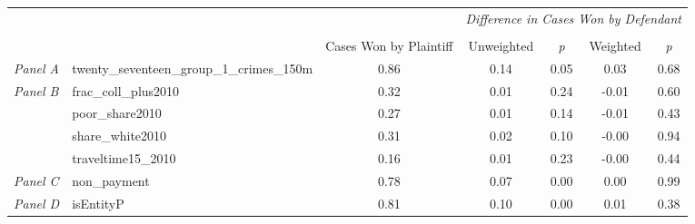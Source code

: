 \begin{tabular}{llccccc}
\toprule
 &  & \textit{} & \multicolumn{4}{c}{\textit{Difference in Cases Won by Defendant}} \\
\cline{4-7}
\\
 &  & Cases Won by Plaintiff & Unweighted & \emph{p} & Weighted & \emph{p} \\
\midrule
\textit{Panel A} & twenty_seventeen_group_1_crimes_150m & 0.86 & 0.14 & 0.05 & 0.03 & 0.68 \\
\cline{1-7}
\multirow[c]{4}{3cm}{\textit{Panel B}} & frac_coll_plus2010 & 0.32 & 0.01 & 0.24 & -0.01 & 0.60 \\
 & poor_share2010 & 0.27 & 0.01 & 0.14 & -0.01 & 0.43 \\
 & share_white2010 & 0.31 & 0.02 & 0.10 & -0.00 & 0.94 \\
 & traveltime15_2010 & 0.16 & 0.01 & 0.23 & -0.00 & 0.44 \\
\cline{1-7}
\textit{Panel C} & non_payment & 0.78 & 0.07 & 0.00 & 0.00 & 0.99 \\
\cline{1-7}
\textit{Panel D} & isEntityP & 0.81 & 0.10 & 0.00 & 0.01 & 0.38 \\
\cline{1-7}
\bottomrule
\end{tabular}

